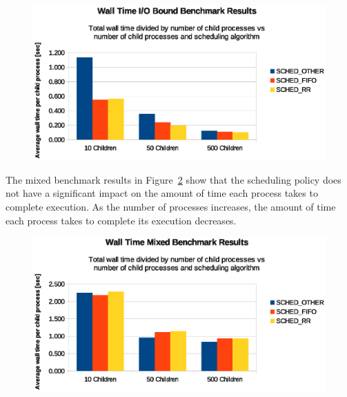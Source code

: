 \begin{figure}[hbtp]
  \centering
  \includegraphics[scale=0.8]{img/io-wall-child.eps}
  \caption{}
  \label{fig:io-wall-child}
\end{figure}

The mixed benchmark results in Figure~\ref{fig:mix-wall-child} show that the scheduling policy does not have a significant impact on the amount of time each process takes to complete execution.  As the number of processes increases, the amount of time each process takes to complete its execution decreases.

\begin{figure}[hbtp]
  \centering
  \includegraphics[scale=0.8]{img/mix-wall-child.eps}
  \caption{}
  \label{fig:mix-wall-child}
\end{figure}
